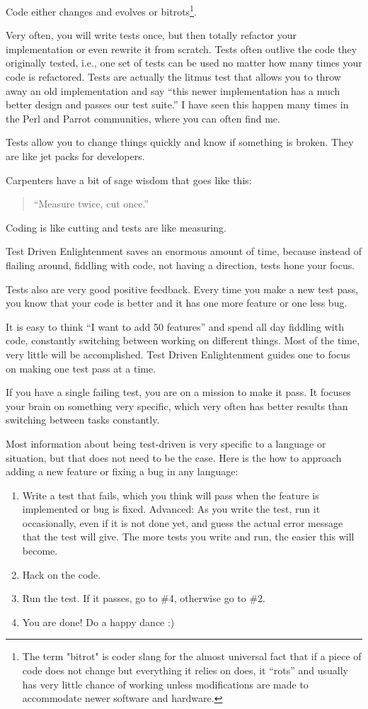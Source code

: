 Code either changes and evolves or bitrots\footnote{The term "bitrot" is coder
slang for the almost universal fact that if a piece of code does not change but
everything it relies on does, it ``rots'' and usually has very little chance of
working unless modifications are made to accommodate newer software and
hardware.}.

Very often, you will write tests once, but then totally refactor your
implementation or even rewrite it from scratch. Tests often outlive the code
they originally tested, i.e., one set of tests can be used no matter how many
times your code is refactored. Tests are actually the litmus test that allows you to throw away an old implementation and say ``this newer implementation has a much better design and passes our test suite.'' I have seen this happen many
times in the Perl and Parrot communities, where you can often find me.

Tests allow you to change things quickly and know if something is broken. They
are like jet packs for developers.

Carpenters have a bit of sage wisdom that goes like this:
\begin{quote}``Measure twice, cut once.''\end{quote} 

Coding is like cutting and tests are like measuring.

Test Driven Enlightenment saves an enormous amount of time, because instead of
flailing around, fiddling with code, not having a direction, tests hone your
focus.

Tests also are very good positive feedback. Every time you make a new test pass,
you know that your code is better and it has one more feature or one less bug.

It is easy to think ``I want to add 50 features'' and spend all day fiddling
with code, constantly switching between working on different things. Most of the
time, very little will be accomplished. Test Driven Enlightenment guides one to
focus on making one test pass at a time.

If you have a single failing test, you are on a mission to make it pass. It focuses
your brain on something very specific, which very often has better results than
switching between tasks constantly.

Most information about being test-driven is very specific to a language or
situation, but that does not need to be the case. Here is the how to approach
adding a new feature or fixing a bug in any language:
\begin{enumerate}
 \item Write a test that fails, which you think will pass when the feature is
implemented or bug is fixed. Advanced: As you write the test, run it
occasionally, even if it is not done yet, and guess the actual error message
that the test will give. The more tests you write and run, the easier this will
become.
 \item Hack on the code.
 \item Run the test. If it passes, go to \#4, otherwise go to \#2.
 \item You are done! Do a happy dance :)
\end{enumerate}

